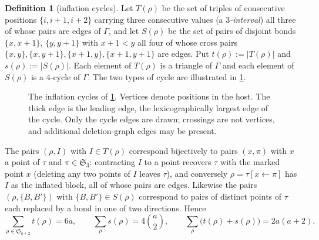 \documentclass[11pt,reqno]{amsart}
\theoremstyle{plain}
\theoremstyle{definition}
\newtheorem{definition}[definition]{Definition}
\theoremstyle{remark}
\newcommand{\Sym}{\mathfrak{S}}
\newcommand{\Gam}{\Gamma}
\begin{document}
\begin{definition}[inflation cycles]\label{def:cycles}
Let $T(\rho)$ be the set of triples of consecutive positions $\{i,i+1,i+2\}$ carrying three consecutive values (a \emph{$3$-interval}) all three of whose pairs are edges of $\Gam$, and let $S(\rho)$ be the set of pairs of disjoint bonds $\{x,x+1\}$, $\{y,y+1\}$ with $x+1<y$ all four of whose cross pairs $\{x,y\},\{x,y+1\},\{x+1,y\},\{x+1,y+1\}$ are edges. Put $t(\rho):=|T(\rho)|$ and $s(\rho):=|S(\rho)|$. Each element of $T(\rho)$ is a triangle of $\Gam$ and each element of $S(\rho)$ is a $4$-cycle of $\Gam$. The two types of cycle are illustrated in \cref{fig:cycles}.
\end{definition}

\begin{figure}[htbp]
\centering
{}
\caption{The inflation cycles of \cref{def:cycles}. Vertices denote
positions in the host. The thick edge is the leading edge, the lexicographically largest
edge of the cycle. Only the cycle edges are drawn; crossings are not
vertices, and additional deletion-graph edges may be present.}
\label{fig:cycles}
\end{figure}

The pairs $(\rho,I)$ with $I\in T(\rho)$ correspond bijectively to pairs $(x,\pi)$ with $x$ a point of $\tau$ and $\pi\in\Sym_3$: contracting $I$ to a point recovers $\tau$ with the marked point $x$ (deleting any two points of $I$ leaves $\tau$), and conversely $\rho=\tau[x\leftarrow\pi]$ has $I$ as the inflated block, all of whose pairs are edges. Likewise the pairs $(\rho,\{B,B'\})$ with $\{B,B'\}\in S(\rho)$ correspond to pairs of distinct points of $\tau$ each replaced by a bond in one of two directions. Hence
\begin{equation}\label{eq:ts}
\sum_{\rho\in\Sym_{a+2}}t(\rho)=6a,\qquad\sum_{\rho}s(\rho)=4\binom a2,\qquad \sum_\rho\bigl(t(\rho)+s(\rho)\bigr)=2a(a+2).
\end{equation}
\end{document}
